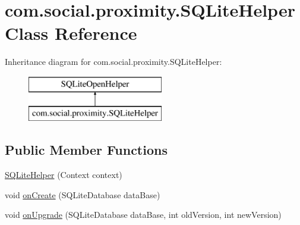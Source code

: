 \hypertarget{classcom_1_1social_1_1proximity_1_1_s_q_lite_helper}{}\section{com.\+social.\+proximity.\+S\+Q\+Lite\+Helper Class Reference}
\label{classcom_1_1social_1_1proximity_1_1_s_q_lite_helper}
Inheritance diagram for com.\+social.\+proximity.\+S\+Q\+Lite\+Helper\+:\begin{figure}[H]
\begin{center}
\leavevmode
\includegraphics[height=2.000000cm]{classcom_1_1social_1_1proximity_1_1_s_q_lite_helper}
\end{center}
\end{figure}
\subsection*{Public Member Functions}
\begin{DoxyCompactItemize}
\item 
\hyperlink{classcom_1_1social_1_1proximity_1_1_s_q_lite_helper_a4bda85b0b433c8670f2ec11706fdbf53}{S\+Q\+Lite\+Helper} (Context context)
\item 
void \hyperlink{classcom_1_1social_1_1proximity_1_1_s_q_lite_helper_a1487315f51cd3c1400563bc1737aa5dc}{on\+Create} (S\+Q\+Lite\+Database data\+Base)
\item 
void \hyperlink{classcom_1_1social_1_1proximity_1_1_s_q_lite_helper_a5d049ccb92e3385123eab21ea55a25fc}{on\+Upgrade} (S\+Q\+Lite\+Database data\+Base, int old\+Version, int new\+Version)
\end{DoxyCompactItemize}
